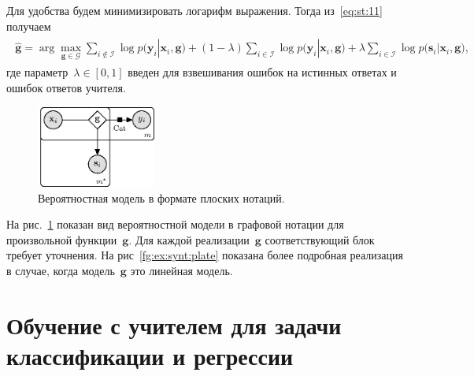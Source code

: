 \documentclass[12pt]{a&t}
\begin{document}
Для удобства будем минимизировать логарифм выражения. Тогда из~\eqref{eq:st:11} получаем
\begin{gather}
\label{eq:st:12}
\begin{aligned}
\hat{\mathbf{g}} = \arg\max_{\mathbf{g}\in \mathcal{G}} \sum_{i\not\in \mathcal{I}}\log p\bigr(\mathbf{y}_i|\mathbf{x}_i, \mathbf{g}\bigr) + \left(1-\lambda\right)\sum_{i\in \mathcal{I}}\log p\bigr(\mathbf{y}_i|\mathbf{x}_i, \mathbf{g}\bigr) + \lambda\sum_{i\in \mathcal{I}}\log p\bigr(\mathbf{s}_i|\mathbf{x}_i, \mathbf{g}\bigr),
\end{aligned}
\end{gather}
где параметр~$\lambda \in [0,1]$ введен для взвешивания ошибок на истинных ответах и ошибок ответов учителя.

\begin{figure}[h!t]\center
\includegraphics[width=0.35\textwidth]{figures/general_model}
\caption{Вероятностная модель в формате плоских нотаций.}
\label{fg:st:plate}
\end{figure}

На рис.~\ref{fg:st:plate} показан вид вероятностной модели в графовой нотации для произвольной функции~$\mathbf{g}$. Для каждой реализации~$\mathbf{g}$ соответствующий блок требует уточнения. На рис~\ref{fg:ex:synt:plate} показана более подробная реализация в случае, когда модель~$\mathbf{g}$ это линейная модель.

\section{Обучение с учителем для задачи классификации и регрессии}
\end{document}
